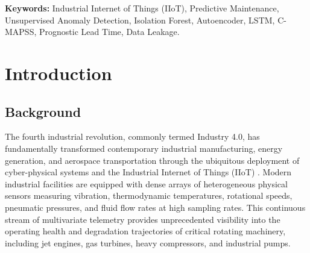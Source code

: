 \documentclass[12pt,a4paper,oneside]{report}
\begin{document}
\vspace{1.5cm}
\noindent \textbf{Keywords:} Industrial Internet of Things (IIoT), Predictive Maintenance, Unsupervised Anomaly Detection, Isolation Forest, Autoencoder, LSTM, C-MAPSS, Prognostic Lead Time, Data Leakage.

\newpage
\tableofcontents

\newpage
\listoffigures

\newpage
\listoftables

\newpage
{}
\setcounter{page}{1}

\chapter{Introduction}

\section{Background}
The fourth industrial revolution, commonly termed Industry 4.0, has fundamentally transformed contemporary industrial manufacturing, energy generation, and aerospace transportation through the ubiquitous deployment of cyber-physical systems and the Industrial Internet of Things (IIoT) \cite{zhao2019deep}. Modern industrial facilities are equipped with dense arrays of heterogeneous physical sensors measuring vibration, thermodynamic temperatures, rotational speeds, pneumatic pressures, and fluid flow rates at high sampling rates. This continuous stream of multivariate telemetry provides unprecedented visibility into the operating health and degradation trajectories of critical rotating machinery, including jet engines, gas turbines, heavy compressors, and industrial pumps.
\end{document}

